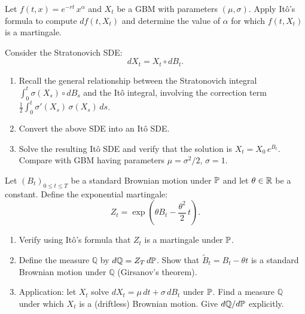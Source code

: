 \begin{exercise}
Let $f(t,x) = e^{-rt}\,x^\alpha$ and $X_t$ be a GBM with parameters
$(\mu, \sigma)$. Apply It\^o's formula to compute $df(t,X_t)$ and
determine the value of $\alpha$ for which $f(t,X_t)$ is a martingale.
\end{exercise}

\begin{exercise}
Consider the Stratonovich SDE:
\[
  dX_t = X_t \circ dB_t.
\]
\begin{enumerate}
  \item Recall the general relationship between the Stratonovich integral
        $\int_0^t \sigma(X_s) \circ dB_s$ and the It\^o integral, involving
        the correction term $\frac{1}{2}\int_0^t \sigma'(X_s)\,\sigma(X_s)\,ds$.
  \item Convert the above SDE into an It\^o SDE.
  \item Solve the resulting It\^o SDE and verify that the solution is
        $X_t = X_0\,e^{B_t}$. Compare with GBM having parameters
        $\mu = \sigma^2/2$, $\sigma = 1$.
\end{enumerate}
\end{exercise}

\begin{exercise}
Let $(B_t)_{0 \leq t \leq T}$ be a standard Brownian motion under $\mathbb{P}$
and let $\theta \in \mathbb{R}$ be a constant. Define the exponential martingale:
\[
  Z_t = \exp\!\left(\theta B_t - \frac{\theta^2}{2}\,t\right).
\]
\begin{enumerate}
  \item Verify using It\^o's formula that $Z_t$ is a martingale under $\mathbb{P}$.
  \item Define the measure $\mathbb{Q}$ by $d\mathbb{Q} = Z_T\,d\mathbb{P}$.
        Show that $\widetilde{B}_t = B_t - \theta t$ is a standard
        Brownian motion under $\mathbb{Q}$ (Girsanov's theorem).
  \item Application: let $X_t$ solve
        $dX_t = \mu\,dt + \sigma\,dB_t$ under $\mathbb{P}$. Find a measure
        $\mathbb{Q}$ under which $X_t$ is a (driftless) Brownian motion.
        Give $d\mathbb{Q}/d\mathbb{P}$ explicitly.
\end{enumerate}
\end{exercise}

